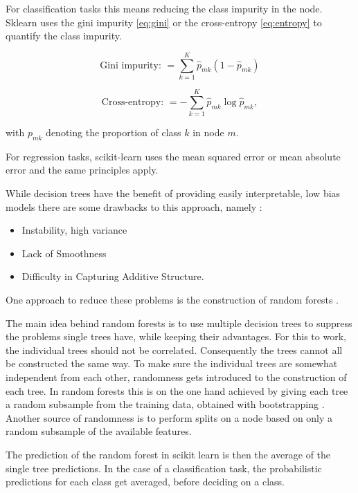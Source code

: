 For classification tasks this means reducing the class impurity in the node.
Sklearn uses the gini impurity \eqref{eq:gini} or the
cross-entropy \eqref{eq:entropy} to quantify the class impurity.

\begin{equation}
	\text{Gini impurity: } = \sum_{k=1}^K \hat{p}_{mk}(1-\hat{p}_{mk})
    \label{eq:gini}
\end{equation}

\begin{equation}
    \text{Cross-entropy: } = -\sum_{k=1}^K \hat{p}_{mk}\log{\hat{p}_{mk}},
    \label{eq:entropy}
\end{equation}

with $p_{mk}$ denoting the proportion of class $k$ in node $m$.


For regression tasks, scikit-learn uses the mean squared error
or mean absolute error and the same principles apply.

While decision trees have the benefit of providing
easily interpretable, low bias models there are some drawbacks to this
approach, namely \cite{hastie2017springer}:
\begin{itemize}
  \item{Instability, high variance}
  \item{Lack of Smoothness}
  \item{Difficulty in Capturing Additive Structure}.
\end{itemize}

One approach to reduce these problems is the construction of
random forests \cite{Breiman2001}.

The main idea behind random forests is to use multiple
decision trees to suppress the problems single trees have, while
keeping their advantages.
For this to work, the individual trees should not be correlated.
Consequently the trees cannot all be constructed the same way.
To make sure the individual trees
are somewhat independent from each other,
randomness gets introduced to the construction of each tree.
In random forests this is on the one hand achieved by giving each tree a
random subsample from the training data, obtained with bootstrapping \cite{efron1992bootstrap}.
Another source of randomness is to perform splits on a node
based on only a random subsample of the available features.

The prediction of the random forest in scikit learn is then the average of
the single tree predictions.
In the case of a classification task, the probabilistic predictions for each class
get averaged, before deciding on a class.


